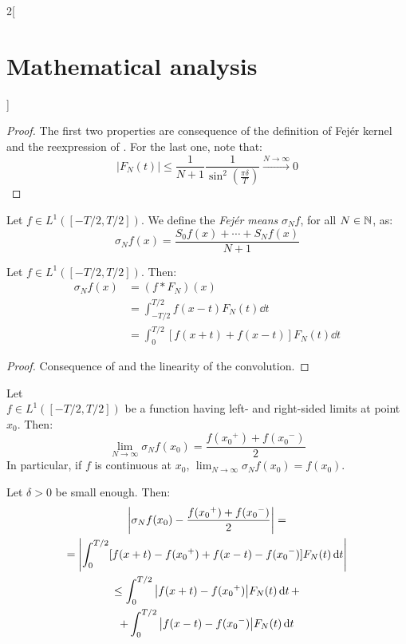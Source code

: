 \documentclass[../../../main_math.tex]{subfiles}
\begin{document}
\begin{multicols}{2}[\section{Mathematical analysis}]
\begin{proposition}
  \end{proposition}
  \begin{proof}
    The first two properties are consequence of the definition of Fejér kernel and the reexpression of . For the last one, note that:
    $$|F_N(t)|\leq \frac{1}{N+1}\frac{1}{\sin^2\left(\frac{\pi \delta}{T}\right)}\overset{N\to\infty}{\longrightarrow} 0$$
  \end{proof}
  \begin{definition}
    Let $f\in L^1([-T/2,T/2])$. We define the \emph{Fejér means} $\sigma_Nf$, for all $N\in\mathbb{N} $, as:
    \begin{equation}\label{MA:fejermeans}
      \sigma_Nf(x)=\frac{S_0f(x)+\cdots+S_Nf(x)}{N+1}
    \end{equation}
  \end{definition}
  \begin{proposition}
    Let $f\in L^1([-T/2,T/2])$. Then:
    \begin{align*}
      \sigma_Nf(x) & =(f*F_N)(x)                              \\
                   & =\int_{-T/2}^{T/2}f(x-t)F_N(t)\dd{t}     \\
                   & =\int_0^{T/2}[f(x+t)+f(x-t)]F_N(t)\dd{t}
    \end{align*}
  \end{proposition}
  \begin{proof}
    Consequence of  and the linearity of the convolution.
  \end{proof}
  \begin{theorem}
    Let \\$f\in L^1([-T/2,T/2])$ be a function having left- and right-sided limits at point $x_0$. Then: $$\lim_{N\to\infty}\sigma_Nf(x_0)=\frac{f({x_0}^+)+f({x_0}^-)}{2}$$ In particular, if $f$ is continuous at $x_0$, $\displaystyle\lim_{N\to\infty}\sigma_Nf(x_0)=f(x_0).$
  \end{theorem}
  \begin{sproof}
    Let $\delta>0$ be small enough. Then:
    \begin{multline*}
      \abs{\sigma_Nf(x_0)-\frac{f({x_0}^+)+f({x_0}^-)}{2}}=\\
      =\abs{\int_0^{T/2}[f(x+t)-f({x_0}^+)+f(x-t)-f({x_0}^-)]F_N(t)\dd{t}} \\
      \leq \int_0^{T/2}\abs{f(x+t)-f({x_0}^+)}F_N(t)\dd{t}+\\+\int_0^{T/2}\abs{f(x-t)-f({x_0}^-)}F_N(t)\dd{t}
    \end{multline*}

\end{sproof}
\end{multicols}
\end{document}
